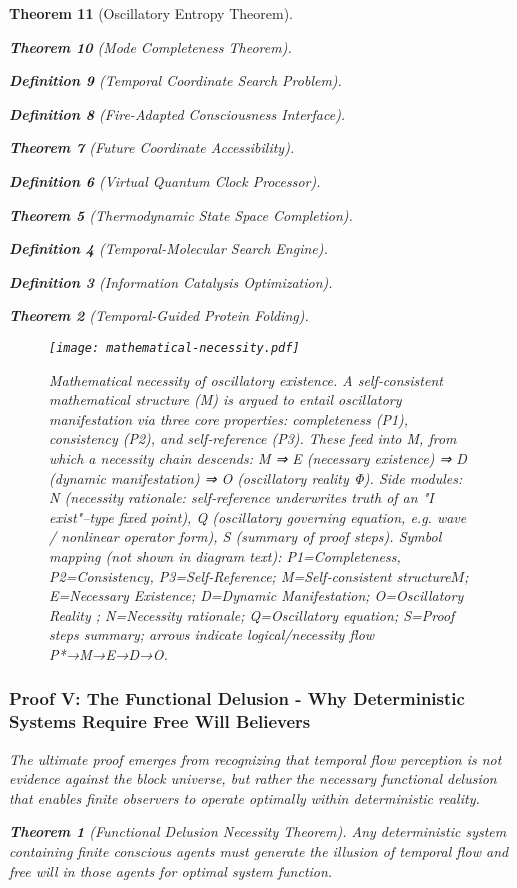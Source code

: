 \documentclass[12pt,a4paper]{article}
\newtheorem{theorem}{Theorem}[section]
\newtheorem{definition}[theorem]{Definition}
\begin{document}
\begin{theorem}[Oscillatory Entropy Theorem]
\begin{theorem}[Mode Completeness Theorem]
\begin{enumerate}
\begin{definition}[Temporal Coordinate Search Problem]
\begin{algorithm}
\begin{definition}[Fire-Adapted Consciousness Interface]
\begin{theorem}[Future Coordinate Accessibility]
\begin{definition}[Virtual Quantum Clock Processor]
\begin{itemize}
\begin{itemize}
\begin{theorem}[Thermodynamic State Space Completion]
\begin{definition}[Temporal-Molecular Search Engine]
\begin{definition}[Information Catalysis Optimization]
\begin{algorithm}
\begin{theorem}[Temporal-Guided Protein Folding]
\begin{table}[h]
\begin{figure}[h]
\centering
\texttt{[image: mathematical-necessity.pdf]}
\caption{Mathematical necessity of oscillatory existence. A self‑consistent mathematical structure (M) is argued to entail oscillatory manifestation via three core properties: completeness (P1), consistency (P2), and self‑reference (P3). These feed into M, from which a necessity chain descends: M ⇒ E (necessary existence) ⇒ D (dynamic manifestation) ⇒ O (oscillatory reality Φ). Side modules: N (necessity rationale: self‑reference underwrites truth of an "I exist"–type fixed point), Q (oscillatory governing equation, e.g. wave / nonlinear operator form), S (summary of proof steps). Symbol mapping (not shown in diagram text): P1=Completeness, P2=Consistency, P3=Self‑Reference; M=Self‑consistent structure$M$; E=Necessary Existence; D=Dynamic Manifestation; O=Oscillatory Reality \phi; N=Necessity rationale; Q=Oscillatory equation; S=Proof steps summary; arrows indicate logical/necessity flow P*→M→E→D→O.}
\label{fig:mathematical-necessity}
\end{figure}

\subsubsection{Proof V: The Functional Delusion - Why Deterministic Systems Require Free Will Believers}

The ultimate proof emerges from recognizing that temporal flow perception is not evidence against the block universe, but rather the necessary functional delusion that enables finite observers to operate optimally within deterministic reality.

\begin{theorem}[Functional Delusion Necessity Theorem]
Any deterministic system containing finite conscious agents must generate the illusion of temporal flow and free will in those agents for optimal system function.
\end{theorem}


\end{table}
\end{theorem}
\end{algorithm}
\end{definition}
\end{definition}
\end{theorem}
\end{itemize}
\end{itemize}
\end{definition}
\end{theorem}
\end{definition}
\end{algorithm}
\end{definition}
\end{enumerate}
\end{theorem}
\end{theorem}
\end{document}
